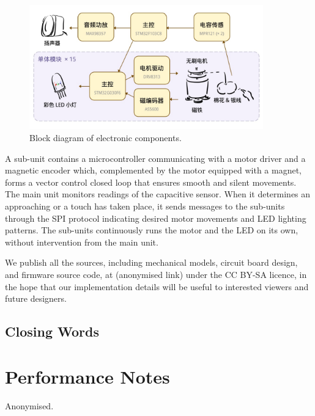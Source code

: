 \documentclass{nimemusic}
\begin{document}
\begin{figure}[h!]
  \includegraphics[width=0.9\textwidth]{../../images/CuHum_Block.jpg}
  \caption{Block diagram of electronic components.}
  \label{fig:Block}
\end{figure}

A sub-unit contains a microcontroller communicating with a motor driver and a magnetic encoder which, complemented by the motor equipped with a magnet, forms a vector control closed loop that ensures smooth and silent movements. The main unit monitors readings of the capacitive sensor. When it determines an approaching or a touch has taken place, it sends messages to the sub-units through the SPI protocol indicating desired motor movements and LED lighting patterns. The sub-units continuously runs the motor and the LED on its own, without intervention from the main unit.

We publish all the sources, including mechanical models, circuit board design, and firmware source code, at (anonymised link) under the CC BY-SA licence, in the hope that our implementation details will be useful to interested viewers and future designers.

\subsection{Closing Words}

\section{Performance Notes}
\label{sect:Perf_Notes}

\begin{acks}
Anonymised.
\end{acks}

% 
% 
\end{document}
